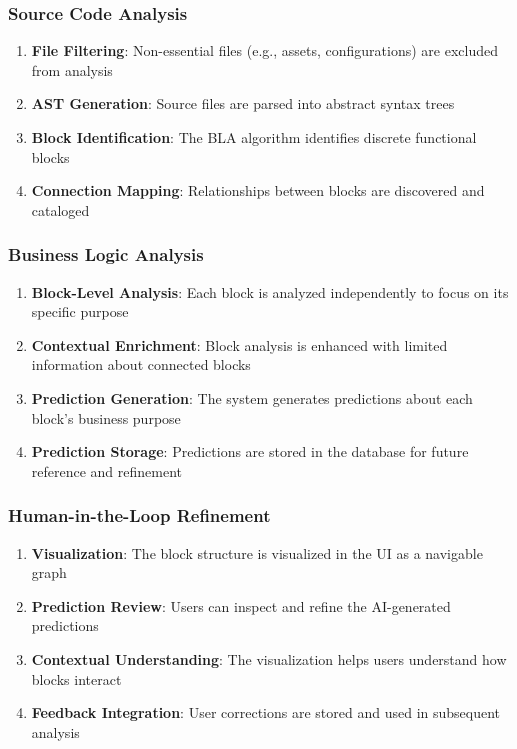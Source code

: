 \subsubsection{Source Code Analysis}

\begin{enumerate}
    \item \textbf{File Filtering}: Non-essential files (e.g., assets, configurations) are excluded from analysis
    \item \textbf{AST Generation}: Source files are parsed into abstract syntax trees
    \item \textbf{Block Identification}: The BLA algorithm identifies discrete functional blocks
    \item \textbf{Connection Mapping}: Relationships between blocks are discovered and cataloged
\end{enumerate}

\subsubsection{Business Logic Analysis}

\begin{enumerate}
    \item \textbf{Block-Level Analysis}: Each block is analyzed independently to focus on its specific purpose
    \item \textbf{Contextual Enrichment}: Block analysis is enhanced with limited information about connected blocks
    \item \textbf{Prediction Generation}: The system generates predictions about each block's business purpose
    \item \textbf{Prediction Storage}: Predictions are stored in the database for future reference and refinement
\end{enumerate}

\subsubsection{Human-in-the-Loop Refinement}

\begin{enumerate}
    \item \textbf{Visualization}: The block structure is visualized in the UI as a navigable graph
    \item \textbf{Prediction Review}: Users can inspect and refine the AI-generated predictions
    \item \textbf{Contextual Understanding}: The visualization helps users understand how blocks interact
    \item \textbf{Feedback Integration}: User corrections are stored and used in subsequent analysis
\end{enumerate}

